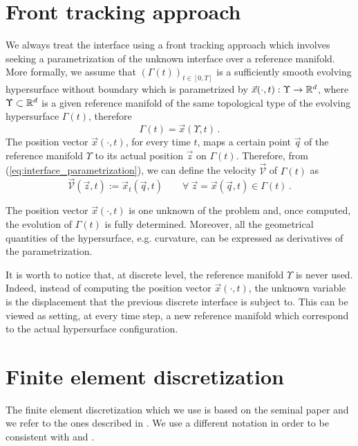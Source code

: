 \section[Front tracking approach]{Front tracking approach}
We always treat the interface using a front tracking approach which involves
seeking a parametrization of the unknown interface over a reference manifold.
More formally, we assume that $(\Gamma(t))_{t\in [0,T]}$ is a sufficiently
smooth evolving hypersurface without boundary which is parametrized by
$\vec x(\cdot,t):\Upsilon\to{\mathbb R}^d$, where $\Upsilon\subset {\mathbb R}^d$ is a given
reference manifold of the same topological type of the evolving hypersurface
$\Gamma(t)$, therefore
\begin{equation}\label{eq:interface_parametrization}
\Gamma(t) = \vec x(\Upsilon,t)\,.
\end{equation}
The position vector $\vec x(\cdot,t)$, for every time $t$, maps a certain point
$\vec{q}$ of the reference manifold $\Upsilon$ to its actual position
$\vec{z}$ on $\Gamma(t)$. Therefore, from (\ref{eq:interface_parametrization}),
we can define the velocity $\vec{\mathcal{V}}$ of $\Gamma(t)$ as
\begin{equation} \label{eq:V}
\vec{\mathcal{V}}(\vec z, t) := \vec x_t(\vec q, t) \qquad
\forall\ \vec z = \vec x(\vec q,t) \in \Gamma(t)\,.
\end{equation}

The position vector $\vec x(\cdot,t)$ is one unknown of the problem and, once
computed, the evolution of $\Gamma(t)$ is fully determined. Moreover, all the
geometrical quantities of the hypersurface, e.g. curvature, can be expressed as
derivatives of the parametrization.

It is worth to notice that, at discrete level, the reference manifold
$\Upsilon$ is never used. Indeed, instead of computing the position vector
$\vec x(\cdot,t)$, the unknown variable is the displacement that the previous
discrete interface is subject to. This can be viewed as setting, at every time
step, a new reference manifold which correspond to the actual hypersurface
configuration.

\section[Finite element discretization]{Finite element discretization}
The finite element discretization which we use is based on the seminal paper
\cite{Dziuk91} and we refer to the ones described in
\cite{triplej,triplejMC,gflows3d}. We use a different notation in order to be
consistent with \cite{spurious} and \cite{stokesfitted}.

